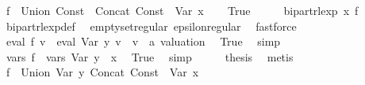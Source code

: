 \begin{isabellebody}
\isamarkupfalse%
\ {\isacharquery}{\kern0pt}f{\isacharprime}{\kern0pt}\ {\isacharequal}{\kern0pt}\ {\isachardoublequoteopen}Union\ {\isacharparenleft}{\kern0pt}Const\ {\isacharbraceleft}{\kern0pt}{\isacharbraceright}{\kern0pt}{\isacharparenright}{\kern0pt}\ {\isacharparenleft}{\kern0pt}Concat\ {\isacharparenleft}{\kern0pt}Const\ {\isacharbraceleft}{\kern0pt}{\isacharbrackleft}{\kern0pt}{\isacharbrackright}{\kern0pt}{\isacharbraceright}{\kern0pt}{\isacharparenright}{\kern0pt}\ {\isacharparenleft}{\kern0pt}Var\ x{\isacharparenright}{\kern0pt}{\isacharparenright}{\kern0pt}{\isachardoublequoteclose}\isanewline
\ \ \isamarkupfalse%
\ True\isanewline
\ \ \isamarkupfalse%
\ \isamarkupfalse%
\ {\isachardoublequoteopen}bipart{\isacharunderscore}{\kern0pt}rlexp\ x\ {\isacharquery}{\kern0pt}f{\isacharprime}{\kern0pt}{\isachardoublequoteclose}\isanewline
\ \ \ \ \isamarkupfalse%
\ bipart{\isacharunderscore}{\kern0pt}rlexp{\isacharunderscore}{\kern0pt}def\ \isamarkupfalse%
\ emptyset{\isacharunderscore}{\kern0pt}regular\ epsilon{\isacharunderscore}{\kern0pt}regular\ \isamarkupfalse%
\ fastforce\isanewline
\ \ \isamarkupfalse%
\ \isamarkupfalse%
\ {\isachardoublequoteopen}eval\ {\isacharquery}{\kern0pt}f{\isacharprime}{\kern0pt}\ v\ {\isacharequal}{\kern0pt}\ eval\ {\isacharparenleft}{\kern0pt}Var\ y{\isacharparenright}{\kern0pt}\ v{\isachardoublequoteclose}\ \ v\ {\isacharcolon}{\kern0pt}{\isacharcolon}{\kern0pt}\ {\isachardoublequoteopen}{\isacharprime}{\kern0pt}a\ valuation{\isachardoublequoteclose}\ \isamarkupfalse%
\ True\ \isamarkupfalse%
\ simp\isanewline
\ \ \isamarkupfalse%
\ \isamarkupfalse%
\ {\isachardoublequoteopen}vars\ {\isacharquery}{\kern0pt}f{\isacharprime}{\kern0pt}\ {\isacharequal}{\kern0pt}\ vars\ {\isacharparenleft}{\kern0pt}Var\ y{\isacharparenright}{\kern0pt}\ {\isasymunion}\ {\isacharbraceleft}{\kern0pt}x{\isacharbraceright}{\kern0pt}{\isachardoublequoteclose}\ \isamarkupfalse%
\ True\ \isamarkupfalse%
\ simp\isanewline
\ \ \isamarkupfalse%
\ \isamarkupfalse%
\ {\isacharquery}{\kern0pt}thesis\ \isamarkupfalse%
\ metis\isanewline
{}\isamarkupfalse%
\isanewline
\ \ \isamarkupfalse%
\ {\isacharquery}{\kern0pt}f{\isacharprime}{\kern0pt}\ {\isacharequal}{\kern0pt}\ {\isachardoublequoteopen}Union\ {\isacharparenleft}{\kern0pt}Var\ y{\isacharparenright}{\kern0pt}\ {\isacharparenleft}{\kern0pt}Concat\ {\isacharparenleft}{\kern0pt}Const\ {\isacharbraceleft}{\kern0pt}{\isacharbraceright}{\kern0pt}{\isacharparenright}{\kern0pt}\ {\isacharparenleft}{\kern0pt}Var\ x{\isacharparenright}{\kern0pt}{\isacharparenright}{\kern0pt}{\isachardoublequoteclose}\isanewline

\end{isabellebody}
